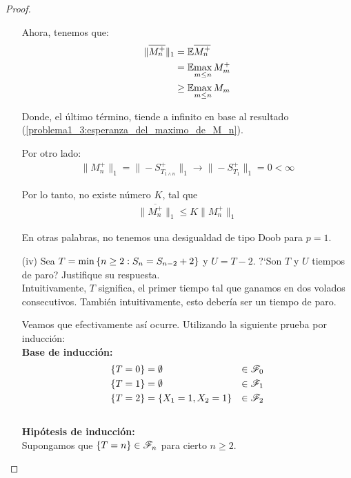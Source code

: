 \begin{proof}
\begin{enumerate}
			Ahora, tenemos que:
			\begin{align}
				\|\overline{M_{n}^{+}}\|_1  &=    \mathbb{E}{\overline{M_{n}^{+}}} \\
											&=    \mathbb{E}{\max_{m \leq n}M_m^+} \\
											&\geq \mathbb{E}{\max_{m \leq n}M_m}										
			\end{align}
				
			Donde, el último término, tiende a infinito en base al resultado 
			(\ref{problema1_3:esperanza_del_maximo_de_M_n}).

			Por otro lado:
			\begin{align}
				\|M_n^+\|_1=\|-S_{T_{1\wedge n}}^{+}\|_1  \longrightarrow  \|-S_{T_1}^+\|_1 = 0 < \infty
			\end{align}
			
			Por lo tanto, no existe número $K$, tal que
			\begin{align}
				 \|\overline{M_n^+}\|_1 \leq  K \|M_n^+\|_1
			\end{align}
			
			En otras palabras, no tenemos una desigualdad de tipo Doob para $p=1$.\\
			
		\item[(iv)]  
		Sea $T=\min\left\{ n\geq 2:S_n=S_{n-2} + 2\right\} $ y $U=T-2$. ?`Son $T$ y $U$ 
		tiempos de paro? Justifique su respuesta.\\
					
			Intuitivamente, $T$ significa, el primer tiempo tal que ganamos en dos volados consecutivos.
			También intuitivamente, esto debería ser un tiempo de paro.
			
			Veamos que efectivamente así ocurre. Utilizando la siguiente prueba por inducción:\\
			
			\textbf{Base de inducción:}		
				\begin{align}
					\{T = 0\} 		&= \emptyset  				& 	\in \mathscr{F}_0 \\
					\{T = 1\} 		&= \emptyset  				& 	\in \mathscr{F}_1 \\
			   		\{T = 2\} 		&= \{ X_1 = 1, X_2 = 1\} 	&	\in \mathscr{F}_2
				\end{align}	\\					
			
			\textbf{Hipótesis de inducción:}\\
			
				Supongamos que $\{T = n\} \in \mathscr{F}_n$ para cierto $n \geq 2$.\\
				

\end{enumerate}
\end{proof}
